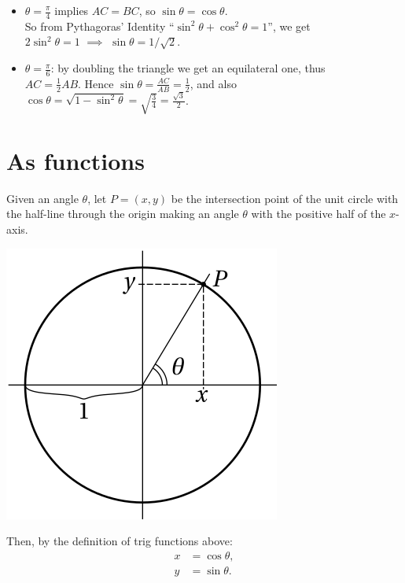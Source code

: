 \documentclass[
  12pt,
  oneside]{book}
\providecommand{\tightlist}{%
  \setlength{\itemsep}{0pt}\setlength{\parskip}{0pt}}
\theoremstyle{definition}
\theoremstyle{definition}
\theoremstyle{definition}
\theoremstyle{definition}
\theoremstyle{remark}
\begin{document}
\begin{itemize}
\tightlist
\item
  \(\theta=\frac{\pi}4\) implies \(AC=BC\), so \(\sin\theta=\cos\theta\).\\
  So from Pythagoras' Identity ``\(\sin^2\theta+\cos^2\theta=1\)'', we get\\
  \(2\sin^2\theta=1\) \(\implies\) \(\sin\theta=1/\sqrt2\).
\item
  \(\theta=\frac{\pi}{6}\): by doubling the triangle we get an equilateral one, thus\\
  \(AC=\frac12AB\). Hence \(\sin\theta=\frac{AC}{AB}=\frac12\), and also\\
  \(\cos\theta=\sqrt{1-\sin^2\theta} = \sqrt{\frac34} = \frac{\sqrt{3}}2\).
\end{itemize}

\section{As functions}\label{as-functions}

Given an angle \(\theta\), let \(P=(x,y)\) be the intersection point of the unit circle with the half-line through the origin making an angle \(\theta\) with the positive half of the \(x\)-axis.

\begin{center}\includegraphics{t15-circle1} \end{center}

Then, by the definition of trig functions above:
\begin{align*}
x&= \cos\theta,\\
y&= \sin\theta.
\end{align*}
\end{document}
